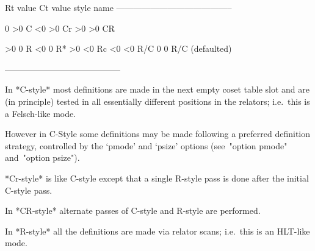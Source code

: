 \begintt
Rt value     Ct value     style name
-----------------------------------------

   0           >0         C
  <0           >0         Cr
  >0           >0         CR

  >0            0         R
  <0            0         R*
  >0           <0         Rc
  <0           <0         R/C
   0            0         R/C (defaulted)

-----------------------------------------
\endtt

In *C-style* most definitions are  made  in
the next empty coset table slot and are (in principle) tested  in  all
essentially different  positions  in  the  relators;  i.e.~this  is  a
Felsch-like mode.

However in C-Style some definitions may be made following a  preferred
definition strategy, controlled by the  `pmode'  and  `psize'  options
(see~"option pmode" and~"option psize").

*Cr-style* is like C-style except that  a
single R-style pass is done after the initial C-style pass.

In *CR-style* alternate passes of C-style
and R-style are performed.

In *R-style* all the definitions  are  made
via relator scans; i.e.~this is an HLT-like mode.

